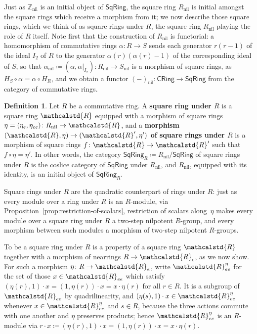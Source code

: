 \documentclass[reqno,a4paper]{amsart}
\theoremstyle{plain}
\theoremstyle{definition}
\newtheorem{definition}[subsection]{Definition}
\newcommand{\defn}{\textbf}
\newcommand{\DefEq}{\coloneq}
\newcommand{\R}{\ensuremath{\mathcalstd{R}}}
\newcommand{\Z}{\ensuremath{\mathbb{Z}}}
\newcommand{\SqRing}{\ensuremath{\mathsf{SqRing}}}
\newcommand{\CRing}{\ensuremath{\mathsf{CRing}}}
\DeclareMathOperator{\nil}{nil}
\renewcommand{\Re}{\ensuremath{\R_{e}}}
\newcommand{\Ree}{\ensuremath{\R_{ee}}}
\begin{document}
Just as \(\Z_{\nil}\) is an initial object of \(\SqRing\), the square ring \(R_{\nil}\) is initial amongst the square rings which receive a morphism from it; we now describe those square rings, which we think of as square rings under \(R\), the square ring \(R_{\nil}\) playing the role of \(R\) itself. Note first that the construction of \(R_{\nil}\) is functorial: a homomorphism of commutative rings \(\alpha\colon R\to S\) sends each generator \(r(r-1)\) of the ideal \(I_{2}\) of \(R\) to the generator \(\alpha(r)(\alpha(r)-1)\) of the corresponding ideal of \(S\), so that \(\alpha_{\nil}\DefEq(\alpha,\alpha|_{I_{2}})\colon R_{\nil}\to S_{\nil}\) is a morphism of square rings, as \(H_{S}\circ\alpha=\alpha\circ H_{R}\), and we obtain a functor \((-)_{\nil}\colon \CRing\to\SqRing\) from the category of commutative rings.

\begin{definition}\label{def:square-ring-under-R}
  Let \(R\) be a commutative ring. A \defn{square ring under \(R\)} is a square ring \(\R\) equipped with a morphism of square rings \(\eta=(\eta_{e},\eta_{ee})\colon R_{\nil}\to\R\), and a \defn{morphism \((\R,\eta)\to(\R',\eta')\) of square rings under \(R\)} is a morphism of square rings \(f\colon \R\to\R'\) such that \(f\circ\eta=\eta'\). In other words, the category \(\SqRing_{R}\DefEq R_{\nil}/\SqRing\) of square rings under \(R\) is the coslice category of \(\SqRing\) under \(R_{\nil}\), and \(R_{\nil}\), equipped with its identity, is an initial object of \(\SqRing_{R}\).
\end{definition}

Square rings under \(R\) are the quadratic counterpart of rings under \(R\): just as every module over a ring under \(R\) is an \(R\)-module, via Proposition~\ref{prop:restriction-of-scalars}, restriction of scalars along~\(\eta\) makes every module over a square ring under \(R\) a two-step nilpotent \(R\)-group, and every morphism between such modules a morphism of two-step nilpotent \(R\)-groups.

To be a square ring under \(R\) is a property of a square ring \(\R\) together with a morphism of nearrings \(R\to\Re\), as we now show. For such a morphism \(\eta\colon R\to\Re\), write \(\Ree^{\eta}\) for the set of those \(x\in\Ree\) which satisfy \((\eta(r),1)\cdot x=(1,\eta(r))\cdot x=x\cdot\eta(r)\) for all \(r\in R\). It is a subgroup of \(\Ree\) by quadrilinearity, and \((\eta(s),1)\cdot x\in\Ree^{\eta}\) whenever \(x\in\Ree^{\eta}\) and \(s\in R\), because the three actions commute with one another and \(\eta\) preserves products; hence \(\Ree^{\eta}\) is an \(R\)-module via \(r\cdot x\DefEq(\eta(r),1)\cdot x=(1,\eta(r))\cdot x=x\cdot\eta(r)\).
\end{document}

